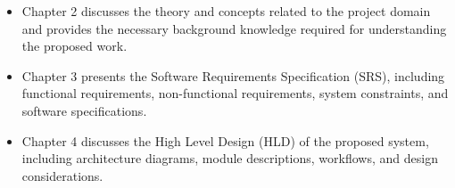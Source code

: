 \begin{itemize}
    \item Chapter 2 discusses the theory and concepts related to the project domain and provides the necessary background knowledge required for understanding the proposed work.
    
    \item Chapter 3 presents the Software Requirements Specification (SRS), including functional requirements, non-functional requirements, system constraints, and software specifications.
    
    \item Chapter 4 discusses the High Level Design (HLD) of the proposed system, including architecture diagrams, module descriptions, workflows, and design considerations.
\end{itemize}
